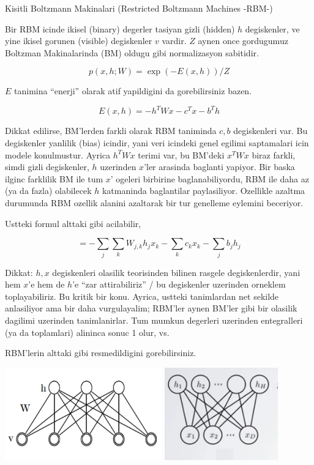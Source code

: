 \documentclass[12pt,fleqn]{article}\usepackage{../common}
\begin{document}
Kisitli Boltzmann Makinalari (Restricted Boltzmann Machines -RBM-)

Bir RBM icinde ikisel (binary) degerler tasiyan gizli (hidden) $h$
degiskenler, ve yine ikisel gorunen (visible) degiskenler $v$ vardir. $Z$
aynen once gordugumuz Boltzman Makinalarinda (BM) oldugu gibi normalizasyon
sabitidir.

$$ p(x,h;W) = \exp (-E(x,h)) / Z $$

$E$ tanimina ``enerji'' olarak atif yapildigini da gorebilirsiniz bazen. 

$$ E(x,h) = -h^TWx - c^Tx - b^Th $$

Dikkat edilirse, BM'lerden farkli olarak RBM taniminda $c,b$ degiskenleri
var. Bu degiskenler yanlilik (bias) icindir, yani veri icindeki genel
egilimi saptamalari icin modele konulmustur. Ayrica $h^TWx$ terimi var, bu
BM'deki $x^TWx$ biraz farkli, simdi gizli degiskenler, $h$ uzerinden
$x$'ler arasinda baglanti yapiyor. Bir baska ilginc farklilik BM ile tum
$x$' ogeleri birbirine baglanabiliyordu, RBM ile daha az (ya da fazla)
olabilecek $h$ katmaninda baglantilar paylasiliyor. Ozellikle azaltma
durumunda RBM ozellik alanini azaltarak bir tur genelleme eylemini
beceriyor.

Ustteki formul alttaki gibi acilabilir,

$$ = - \sum_j \sum_k W_{j,k}h_jx_k - \sum_k c_kx_k - \sum_j b_jh_j  $$

Dikkat: $h,x$ degiskenleri olasilik teorisinden bilinen rasgele
degiskenlerdir, yani hem $x$'e hem de $h$'e ``zar attirabiliriz'' / bu
degiskenler uzerinden orneklem toplayabiliriz. Bu kritik bir konu. Ayrica,
ustteki tanimlardan net sekilde anlasiliyor ama bir daha vurgulayalim;
RBM'ler aynen BM'ler gibi bir olasilik dagilimi uzerinden
tanimlanirlar. Tum mumkun degerleri uzerinden entegralleri (ya da
toplamlari) alininca sonuc 1 olur, vs.

RBM'lerin alttaki gibi resmedildigini gorebilirsiniz.

\includegraphics[height=4cm]{rbm_01.png}
\includegraphics[height=4cm]{rbm_02.png}
\end{document}
